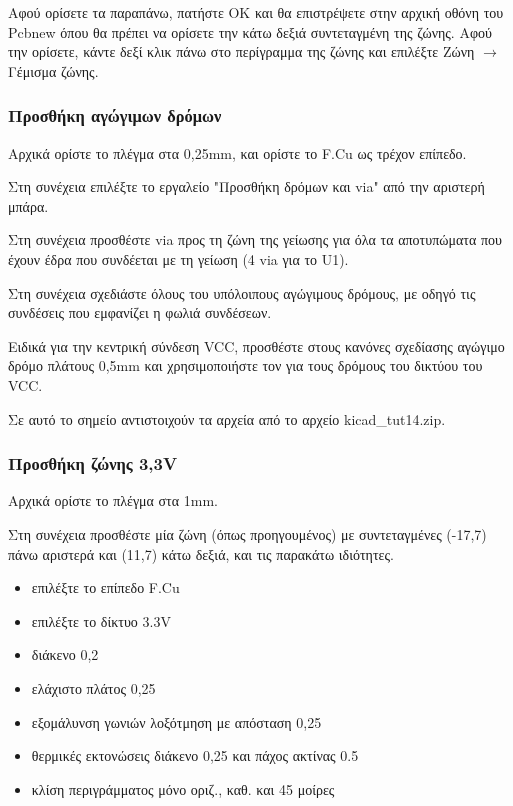 \documentclass[a4paper]{article}
\begin{document}
Αφού ορίσετε τα παραπάνω, πατήστε ΟΚ και θα επιστρέψετε στην αρχική οθόνη του \textenglish{Pcbnew} όπου θα πρέπει να ορίσετε την κάτω δεξιά συντεταγμένη της ζώνης. Αφού την ορίσετε, κάντε δεξί κλικ πάνω στο περίγραμμα της ζώνης και επιλέξτε Ζώνη $\rightarrow$ Γέμισμα ζώνης.

\begin{figure}
  \begin{center}
    \label{fig:kicad-main}
  \end{center}
\end{figure}

\subsubsection{Προσθήκη αγώγιμων δρόμων}

Αρχικά ορίστε το πλέγμα στα 0,25mm, και ορίστε το F.Cu ως τρέχον επίπεδο.

Στη συνέχεια επιλέξτε το εργαλείο "Προσθήκη δρόμων και via" από την αριστερή μπάρα.

Στη συνέχεια προσθέστε via προς τη ζώνη της γείωσης για όλα τα αποτυπώματα που έχουν έδρα που συνδέεται με τη γείωση (4 via για το U1). 


Στη συνέχεια σχεδιάστε όλους του υπόλοιπους αγώγιμους δρόμους, με οδηγό τις συνδέσεις που εμφανίζει η φωλιά συνδέσεων.

Ειδικά για την κεντρική σύνδεση VCC, προσθέστε στους κανόνες σχεδίασης αγώγιμο δρόμο πλάτους 0,5mm και χρησιμοποιήστε τον για τους δρόμους του δικτύου του VCC.


Σε αυτό το σημείο αντιστοιχούν τα αρχεία από το αρχείο kicad\_tut14.zip.

\subsubsection{Προσθήκη ζώνης 3,3V}

Αρχικά ορίστε το πλέγμα στα 1mm.

Στη συνέχεια προσθέστε μία ζώνη (όπως προηγουμένος) με συντεταγμένες (-17,7) πάνω αριστερά και (11,7) κάτω δεξιά, και τις παρακάτω ιδιότητες.

\begin{itemize}
    \item επιλέξτε το επίπεδο F.Cu
    \item επιλέξτε το δίκτυο 3.3V
    \item διάκενο 0,2
    \item ελάχιστο πλάτος 0,25
    \item εξομάλυνση γωνιών λοξότμηση με απόσταση 0,25
    \item θερμικές εκτονώσεις διάκενο 0,25 και πάχος ακτίνας 0.5
    \item κλίση περιγράμματος μόνο οριζ., καθ. και 45 μοίρες
\end{itemize}
\end{document}
